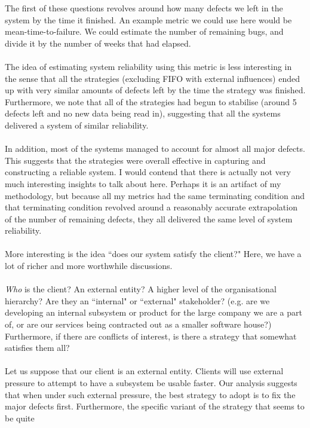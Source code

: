 The first of these questions revolves around how many defects we left in the
system by the time it finished.
An example metric we could use here would be mean-time-to-failure.
We could estimate the number of remaining bugs, and divide it by the
number of weeks that had elapsed.\\
\\
The idea of estimating system reliability using this metric
  is less interesting in the sense that all the
strategies (excluding FIFO with external influences) ended up with very similar
amounts of
defects left by the time the strategy was finished.
Furthermore, we note that all of the strategies had begun to stabilise (around 5
defects left and no new data being read in), suggesting that all the systems
delivered a system of similar reliability.\\
\\
In addition, most of the systems managed to account for almost all major
defects.
This suggests that the strategies were overall effective in capturing and
constructing a reliable system.
I would contend that there is actually not very much interesting insights to
talk about here.
Perhaps it is an artifact of my methodology, but because all
my metrics had the same terminating condition and that terminating condition
revolved around a reasonably accurate extrapolation of the number of remaining
defects, they all delivered the same level of system reliability.\\
\\
More interesting is the idea ``does our system satisfy the client?"
Here, we have a lot of richer and more worthwhile discussions.\\
\\
{\em Who} is the client?
An external entity?
A higher level of the organisational hierarchy?
Are they an ``internal" or ``external" stakeholder?
(e.g. are we developing an internal subsystem or product for the large company
 we are a part of, or are our services being contracted out as a smaller software house?)
Furthermore, if there are conflicts of interest, is there a strategy that
somewhat satisfies them all?\\
\\
Let us suppose that our client is an external entity.
Clients will use external pressure to attempt to have a subsystem be usable
faster.
Our analysis suggests that when under such external pressure, the best strategy
to adopt is to fix the major defects first.
Furthermore, the specific variant of the strategy that seems to be quite
